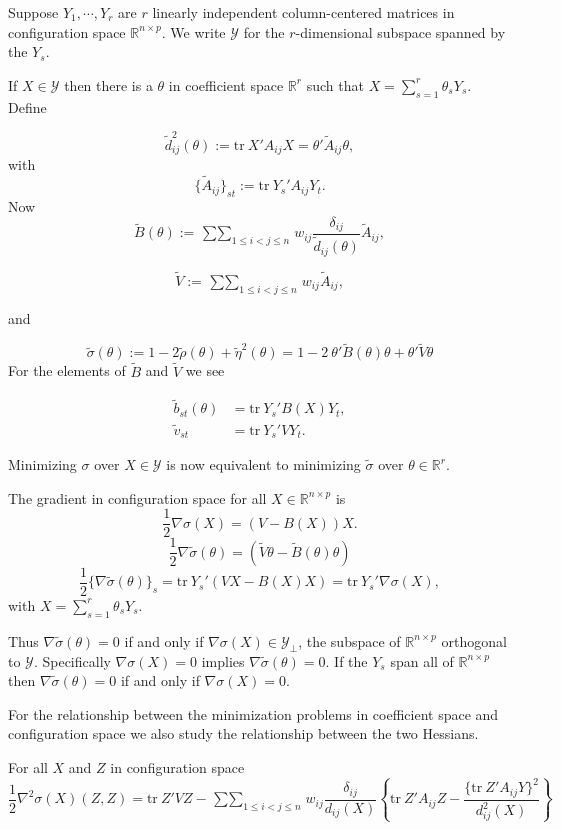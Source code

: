 \documentclass[
  12pt,
]{book}
\theoremstyle{definition}
\theoremstyle{definition}
\theoremstyle{definition}
\theoremstyle{definition}
\theoremstyle{remark}
\begin{document}
Suppose \(Y_1,\cdots,Y_r\) are \(r\) linearly independent column-centered matrices
in configuration space \(\mathbb{R}^{n\times p}\). We write \(\mathcal{Y}\) for the \(r\)-dimensional subspace spanned by the \(Y_s\).

If \(X\in\mathcal{Y}\) then there is a \(\theta\) in coefficient space \(\mathbb{R}^r\) such that \(X=\sum_{s=1}^r\theta_s Y_s\). Define

\[
\tilde d_{ij}^2(\theta):=\text{tr}\ X'A_{ij}X=\theta'\tilde{A}_{ij}\theta,
\]
with
\[
\{\tilde A_{ij}\}_{st}:=\text{tr}\ Y_s'A_{ij}Y_t.
\]
Now
\[
\tilde B(\theta):=\mathop{\sum\sum}_{1\leq i<j\leq n}w_{ij}\frac{\delta_{ij}}{\tilde d_{ij}(\theta)}\tilde A_{ij},
\]

\[
\tilde V:=\mathop{\sum\sum}_{1\leq i<j\leq n}w_{ij}\tilde A_{ij},
\]

and

\[
\tilde\sigma(\theta):=1-2\tilde\rho(\theta)+\tilde\eta^2(\theta)=1-2\ \theta'\tilde B(\theta)\theta+\theta'\tilde V\theta
\]
For the elements of \(\tilde B\) and \(\tilde V\) we see

\begin{align}
\tilde b_{st}(\theta)&=\text{tr}\ Y_s'B(X)Y_t,\\
\tilde v_{st}&=\text{tr}\ Y_s'VY_t.
\end{align}

Minimizing \(\sigma\) over \(X\in\mathcal{Y}\) is now equivalent to minimizing
\(\tilde\sigma\) over \(\theta\in\mathbb{R}^r\).

The gradient in configuration space for all \(X\in\mathbb{R}^{n\times p}\) is
\[
\frac12\nabla\sigma(X)=(V-B(X))X.
\]
\[
\frac12\nabla\tilde\sigma(\theta)=(\tilde V\theta-\tilde B(\theta)\theta)
\]
\[
\frac12\{\nabla\tilde\sigma(\theta)\}_s=\text{tr}\ Y_s'(VX-B(X)X)=\text{tr}\ Y_s'\nabla\sigma(X),
\]
with \(X=\sum_{s=1}^r\theta_sY_s\).

Thus \(\nabla\tilde\sigma(\theta)=0\) if and only if \(\nabla\sigma(X)\in\mathcal{Y}_\perp\), the subspace of \(\mathbb{R}^{n\times p}\) orthogonal to \(\mathcal{Y}\). Specifically \(\nabla\sigma(X)=0\) implies
\(\nabla\tilde\sigma(\theta)=0\). If the
\(Y_s\) span all of \(\mathbb{R}^{n\times p}\) then \(\nabla\tilde\sigma(\theta)=0\)
if and only if \(\nabla\sigma(X)=0\).

For the relationship between the minimization problems in coefficient space and
configuration space we also study the relationship
between the two Hessians.

For all \(X\) and \(Z\) in configuration space
\[
\frac12\nabla^2\sigma(X)(Z,Z)=\text{tr}\ Z'VZ-\mathop{\sum\sum}_{1\leq i<j\leq n}w_{ij}\frac{\delta_{ij}}{d_{ij}(X)}\left\{\text{tr}\ Z'A_{ij}Z-\frac{\{\text{tr}\ Z'A_{ij}Y\}^2}{d_{ij}^2(X)}\right\}
\]
\end{document}
